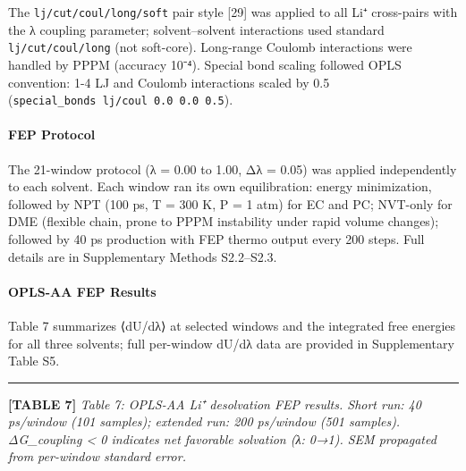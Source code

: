 \documentclass[
  11pt,
]{article}
\begin{document}
The \texttt{lj/cut/coul/long/soft} pair style {[}29{]} was applied to
all Li⁺ cross-pairs with the λ coupling parameter; solvent--solvent
interactions used standard \texttt{lj/cut/coul/long} (not soft-core).
Long-range Coulomb interactions were handled by PPPM (accuracy 10⁻⁴).
Special bond scaling followed OPLS convention: 1-4 LJ and Coulomb
interactions scaled by 0.5
(\texttt{special\_bonds\ lj/coul\ 0.0\ 0.0\ 0.5}).

\paragraph{FEP Protocol}\label{fep-protocol-1}

The 21-window protocol (λ = 0.00 to 1.00, Δλ = 0.05) was applied
independently to each solvent. Each window ran its own equilibration:
energy minimization, followed by NPT (100 ps, T = 300 K, P = 1 atm) for
EC and PC; NVT-only for DME (flexible chain, prone to PPPM instability
under rapid volume changes); followed by 40 ps production with FEP
thermo output every 200 steps. Full details are in Supplementary Methods
S2.2--S2.3.

\paragraph{OPLS-AA FEP Results}\label{opls-aa-fep-results}

Table 7 summarizes ⟨dU/dλ⟩ at selected windows and the integrated free
energies for all three solvents; full per-window dU/dλ data are provided
in Supplementary Table S5.

\begin{center}\rule{0.5\linewidth}{0.5pt}\end{center}

\textbf{{[}TABLE 7{]}} \emph{Table 7: OPLS-AA Li⁺ desolvation FEP
results. Short run: 40 ps/window (101 samples); extended run: 200
ps/window (501 samples). ΔG\_coupling \textless{} 0 indicates net
favorable solvation (λ: 0→1). SEM propagated from per-window standard
error.}
\end{document}

